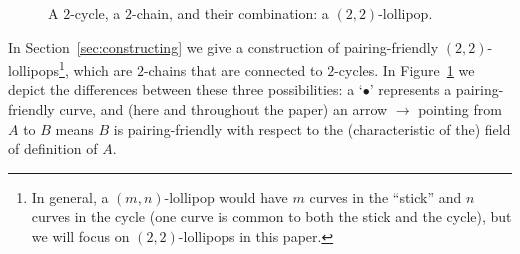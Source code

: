 \documentclass[version=preprint]{iacrcc}
\begin{document}
\begin{enumerate}
  \begin{figure}[!ht]
        \centering
        \hfil
	\hfil
        \caption{A $2$-cycle, a $2$-chain, and their combination: a $(2,2)$-lollipop.}
	\label{fig:all3}
    \end{figure}

In Section~\ref{sec:constructing} we give a construction of pairing-friendly $(2,2)$-lollipops\footnote{In general, a $(m,n)$-lollipop would have $m$ curves in the ``stick'' and $n$ curves in the cycle (one curve is common to both the stick and the cycle), but we will focus on $(2,2)$-lollipops in this paper.}, which are $2$-chains that are connected to $2$-cycles. In Figure~\ref{fig:all3} we depict the differences between these three possibilities: a `$\bullet$' represents a pairing-friendly curve, and (here and throughout the paper) an arrow $\rightarrow$ pointing from $A$ to $B$ means $B$ is pairing-friendly with respect to the (characteristic of the) field of definition of $A$.  


\end{enumerate}
\end{document}

